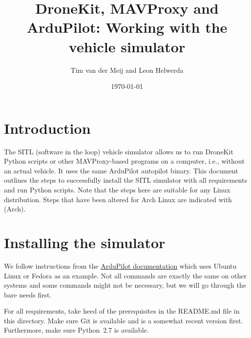 \documentclass{article}
\newcommand{\arch}{{\color{red} (Arch)}}
\begin{document}
\title{DroneKit, MAVProxy and ArduPilot: Working with the vehicle simulator}
\author{Tim van der Meij and Leon Helwerda}
\date{\today}

\maketitle

\section{Introduction}
The SITL (software in the loop) vehicle simulator allows us to run DroneKit 
Python scripts or other MAVProxy-based programs on a computer, i.e., without an 
actual vehicle. It uses the same ArduPilot autopilot binary. This document 
outlines the steps to successfully install the SITL simulator with all 
requirements and run Python scripts. Note that the steps here are suitable for 
any Linux distribution. Steps that have been altered for Arch Linux are 
indicated with \arch{}.

\section{Installing the simulator}
We follow instructions from the 
\href{http://ardupilot.org/dev/docs/setting-up-sitl-on-linux.html}{ArduPilot 
documentation} which uses Ubuntu Linux or Fedora as an example. Not all 
commands are exactly the same on other systems and some commands might not be 
necessary, but we will go through the bare needs first.

For all requirements, take heed of the prerequisites in the README.md file in 
this directory. Make sure Git is available and is a somewhat recent version 
first. Furthermore, make sure Python~2.7 is available.
\end{document}
